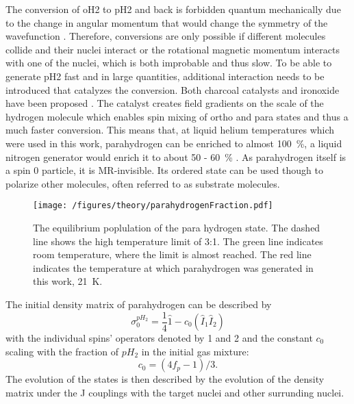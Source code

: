             The conversion of oH2 to pH2 and back is forbidden quantum mechanically due to the change in angular momentum that would change the symmetry of the wavefunction \cite{minaev_spin_1995}. Therefore, conversions are only possible if different molecules collide and their nuclei interact or the rotational magnetic momentum interacts with one of the nuclei, which is both improbable and thus slow. To be able to generate pH2 fast and in large quantities, additional interaction needs to be introduced that catalyzes the conversion. Both charcoal catalysts and ironoxide have been proposed \cite{dechent_proton_nodate}. The catalyst creates field gradients on the scale of the hydrogen molecule which enables spin mixing of ortho and para states\cite{minaev_spin_1995} and thus a much faster conversion. This means that, at liquid helium temperatures which were used in this work, parahydrogen can be enriched to almost \SI{100}{\%}, a liquid nitrogen generator would enrich it to about 50 - \SI{60}{\%} \cite{zhuzhgov_low-temperature_2018}.
            As parahydrogen itself is a spin 0 particle, it is MR-invisible. Its ordered state can be used though to polarize other molecules, often referred to as substrate molecules.
            \begin{figure}
                \centering
                \texttt{[image: /figures/theory/parahydrogenFraction.pdf]}
                \caption[Parahydrogen fraction]{The equilibrium poplulation of the para hydrogen state. The dashed line shows the high temperature limit of 3:1. The green line indicates room temperature, where the limit is almost reached. The red line indicates the temperature at which parahydrogen was generated in this work, \SI{21}{\kelvin}.}
                \label{figure:theory:ph2Fraction}
            \end{figure}
            The initial density matrix of parahydrogen can be described by
            \begin{equation}
                \sigma_0^{pH_2} = \frac{1}{4} \hat 1 - c_0(\hat{I}_1\hat{I}_2)
            \end{equation}
            with the individual spins' operators denoted by 1 and 2 \cite{green_theory_2012-1} and the constant $c_0$ scaling with the fraction of $pH_2$ in the initial gas mixture:
            \begin{equation*}
                c_0=(4f_p-1)/3.
            \end{equation*}
            The evolution of the states is then described by the evolution of the density matrix under the J couplings with the target nuclei and other surrunding nuclei. 
